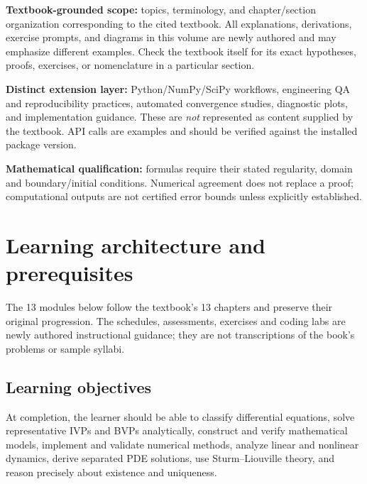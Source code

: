 \documentclass[11pt,letterpaper,oneside]{report}
\theoremstyle{definition}\newtheorem{definition}[theorem]{Definition}
\theoremstyle{remark}\newtheorem{remark}[theorem]{Remark}
\begin{document}
\begin{bookground}
\textbf{Textbook-grounded scope:} topics, terminology, and chapter/section organization corresponding to the cited textbook. All explanations, derivations, exercise prompts, and diagrams in this volume are newly authored and may emphasize different examples. Check the textbook itself for its exact hypotheses, proofs, exercises, or nomenclature in a particular section.
\end{bookground}
\begin{modern}
\textbf{Distinct extension layer:} Python/NumPy/SciPy workflows, engineering QA and reproducibility practices, automated convergence studies, diagnostic plots, and implementation guidance. These are \emph{not} represented as content supplied by the textbook. API calls are examples and should be verified against the installed package version.
\end{modern}
\begin{caution}
\textbf{Mathematical qualification:} formulas require their stated regularity, domain and boundary/initial conditions. Numerical agreement does not replace a proof; computational outputs are not certified error bounds unless explicitly established.
\end{caution}
\tableofcontents\clearpage{}
\chapter{Learning architecture and prerequisites}
\begin{bookground}The 13 modules below follow the textbook's 13 chapters and preserve their original progression. The schedules, assessments, exercises and coding labs are newly authored instructional guidance; they are not transcriptions of the book's problems or sample syllabi.\end{bookground}
\section{Learning objectives}
At completion, the learner should be able to classify differential equations, solve representative IVPs and BVPs analytically, construct and verify mathematical models, implement and validate numerical methods, analyze linear and nonlinear dynamics, derive separated PDE solutions, use Sturm--Liouville theory, and reason precisely about existence and uniqueness.
\end{document}
